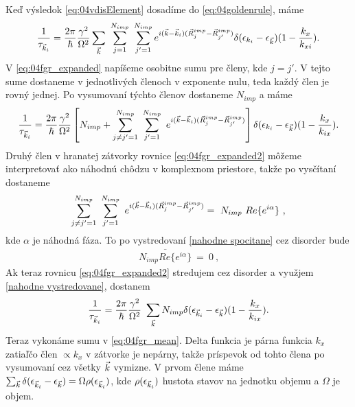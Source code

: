  Keď výsledok \eqref{eq:04vdisElement} dosadíme do \eqref{eq:04goldenrule}, máme
\begin{align}
\label{eq:04fgr_expanded}
\frac{1}{\tau_{\vk_i}} = \frac{2\pi}{\hbar} \frac{\gamma^2}{\Omega^2}
\sum_{\vk}\ \sum_{j=1}^{N_{imp}}\ \sum_{j'=1}^{N_{imp}}e^{i(\vk-\vk_i)(\vec R^{imp}_j-\vec R^{imp}_{j'})}\delta(\epsilon_{k_i}-\epsilon_{\vk})(1-\frac{k_x}{k_{xi}}) \text{.}
\end{align}
V \eqref{eq:04fgr_expanded} napíšeme osobitne sumu pre členy, kde $j=j'$. V tejto sume dostaneme v jednotlivých členoch v exponente nulu, teda každý člen je rovný jednej.
Po vysumovaní týchto členov dostaneme $N_{imp}$ a máme
\begin{align}
\label{eq:04fgr_expanded2}
\frac{1}{\tau_{\vec{k}_i}} = \frac{2\pi}{\hbar} \frac{\gamma^2}{\Omega^2}
\left[
N_{imp}+\sum_{j\neq j'=1}^{N_{imp}}\ \sum_{j'=1}^{N_{imp}} \
e^{i(\vec{k}-\vec{k}_i)(\vec R^{imp}_j-\vec R^{imp}_{j'})}
\right]
\delta(\epsilon_{k_i}-\epsilon_{\vec{k}})(1-\frac{k_x}{k_{ix}}) \text{.}
\end{align}
Druhý člen v hranatej zátvorky rovnice
\eqref{eq:04fgr_expanded2}
 môžeme interpretovať ako náhodnú chôdzu v komplexnom priestore,
 takže po vysčítaní dostaneme
\begin{align}
\label{nahodne spocitane}
\sum_{j\neq j'=1}^{N_{imp}} \ \sum_{j'=1}^{N_{imp}} \
e^{i(\vec{k}-\vec{k}_i)(\vec R^{imp}_j-\vec R^{imp}_{j'})} = \
N_{imp}\  Re\lbrace e^{i\alpha}\rbrace
\ \text{,}
\end{align}
kde $\alpha$ je náhodná fáza.
To po vystredovaní \eqref{nahodne spocitane} cez disorder bude
\begin{align}
\label{nahodne vystredovane}
\overline{N_{imp} Re\lbrace e^{i\alpha}\rbrace}
\ = \ 0
\ \text{,}
\end{align}
Ak teraz  rovnicu  \eqref{eq:04fgr_expanded2} stredujem cez disorder
 a využjem \eqref{nahodne vystredovane}, dostanem
\begin{align}
\label{eq:04fgr_mean}
\frac{1}{\tau_{\vec{k}_i}}= \frac{2\pi}{\hbar} \frac{\gamma^2}{\Omega^2}\
 \sum_{\vec{k}}N_{imp}\delta(\epsilon_{\vec{k}_i}-\epsilon_{\vec{k}})(1-\frac{k_x}{k_{ix}})\text{.}
\end{align}
Teraz vykonáme sumu v \eqref{eq:04fgr_mean}.
Delta funkcia je párna funkcia $k_x$ zatiaľčo člen $\propto k_x$ v zátvorke je nepárny, takže príspevok od tohto člena po vysumovaní cez všetky $\vec{k}$ vymizne.
V prvom člene máme
 $\sum_{\vec{k}}\delta(\epsilon_{\vec{k}_i}-\epsilon_{\vec{k}}) = \Omega\rho(\epsilon_{\vec{k}_i})$, kde $\rho(\epsilon_{\vec{k}_i})$ hustota stavov na jednotku objemu a $\Omega$ je objem.
